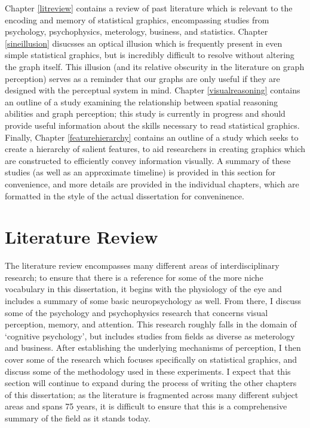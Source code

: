 \documentclass[11pt]{isuthesis}\usepackage[]{graphicx}\usepackage[]{color}
\begin{document}
Chapter \ref{litreview} contains a review of past literature which is relevant to the encoding and memory of statistical graphics, encompassing studies from psychology, psychophysics, meterology, business, and statistics. Chapter \ref{sineillusion} disucsses an optical illusion which is frequently present in even simple statistical graphics, but is incredibly difficult to resolve without altering the graph itself. This illusion (and its relative obscurity in the literature on graph perception) serves as a reminder that our graphs are only useful if they are designed with the perceptual system in mind. Chapter \ref{visualreasoning} contains an outline of a study examining the relationship between spatial reasoning abilities and graph perception; this study is currently in progress and should provide useful information about the skills necessary to read statistical graphics. Finally, Chapter \ref{featurehierarchy} contains an outline of a study which seeks to create a hierarchy of salient features, to aid researchers in creating graphics which are constructed to efficiently convey information visually. A summary of these studies (as well as an approximate timeline) is provided in this section for convenience, and more details are provided in the individual chapters, which are formatted in the style of the actual dissertation for conveninence. 

\section{Literature Review}
The literature review encompasses many different areas of interdisciplinary research; to ensure that there is a reference for some of the more niche vocabulary in this dissertation, it begins with the physiology of the eye and includes a summary of some basic neuropsychology as well. From there, I discuss some of the psychology and psychophysics research that concerns visual perception, memory, and attention. This research roughly falls in the domain of `cognitive psychology', but includes studies from fields as diverse as meterology and business. After establishing the underlying mechanisms of perception, I then cover some of the research which focuses specifically on statistical graphics, and discuss some of the methodology used in these experiments. I expect that this section will continue to expand during the process of writing the other chapters of this dissertation; as the literature is fragmented across many different subject areas and spans 75 years, it is difficult to ensure that this is a comprehensive summary of the field as it stands today. 
\end{document}
